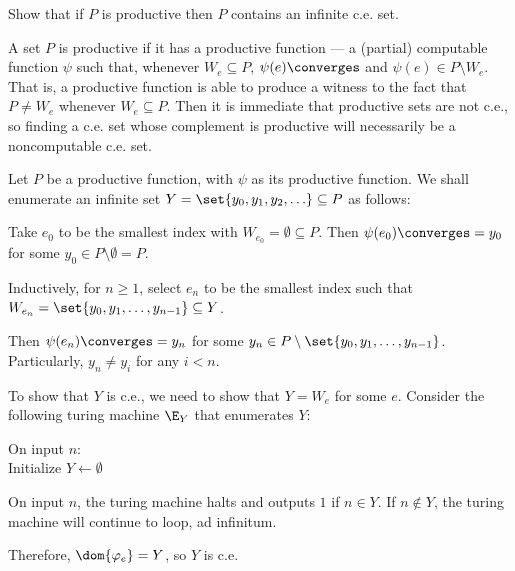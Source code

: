\begin{problem}[5]
  Show that if $P$ is productive then $P$ contains an infinite c.e. set.

  \begin{definition}
    A set $P$ is productive if it has a productive function ---
    a (partial) computable function $\psi$ such that, whenever
    $W_e \subseteq P$, $\psi(e) \converges$ and $\psi(e) \in P \setminus W_e$.
    That is, a productive function is able to
    produce a witness to the fact that $P \neq W_e$ whenever $W_e \subseteq P$.
    Then it is immediate that productive sets are not c.e., so finding a c.e. set whose complement
    is productive will necessarily be a noncomputable c.e. set.
  \end{definition}

  \begin{answer}
    Let $P$ be a productive function, with $\psi$ as its productive function.
    We shall enumerate an infinite set
    $Y = \set{y_0, y_1, y_2, \ldots } \subseteq P$ as follows:

    \begin{enumarabic}
      \item Take $e_0$ to be the smallest index with $W_{e_0} = \emptyset \subseteq P$.
        Then $\psi(e_0) \converges = y_0$ for some $y_0 \in P \setminus \emptyset = P$.

      \item Inductively, for $n \geq 1$,
        select $e_n$ to be the smallest index
        such that $W_{e_n} = \set{y_0, y_1, \ldots, y_{n-1}} \subseteq Y$.
        
        Then $\psi(e_n) \converges = y_n$ for some
        $y_n \in P \setminus \set{y_0, y_1, \ldots, y_{n-1}}$.
        Particularly, $y_n \neq y_i$ for any $i < n$.
    \end{enumarabic}

    \step
    To show that $Y$ is c.e., we need to show that $Y = W_e$ for some $e$.
    Consider the following turing machine $\E_Y$ that enumerates $Y$:

    \step
    \begin{algorithm}[H]\label{tm:5.1}
      \caption{$\varphi_e : Y \to \N$}
      On input $n$: \\
      Initialize $Y \gets \emptyset$ \\
    \end{algorithm}

    On input $n$, the turing machine
    halts and outputs $1$ if $n \in Y$.
    If $n \not\in Y$, the turing machine will continue to loop, ad infinitum.

    Therefore, $\dom{\varphi_e} = Y$, so $Y$ is c.e.
  \end{answer}
\end{problem}

